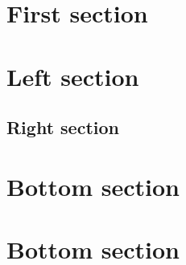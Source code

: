 \documentclass[a4paper, 12pt]{article}
\begin{document}
\begin{adjmulticols}{2}{0pt}{0pt}
\section{First section}
\lipsum[2]

\section{Left section}
\lipsum[1]
\end{adjmulticols}

\begin{adjmulticols}{1}{0pt}{0pt}
\section{Right section}
\lipsum[4]
\end{adjmulticols}

\begin{adjmulticols}{2}{0pt}{0pt}

\section{Bottom section}
\lipsum[2]

\section{Bottom section}
\lipsum[2]

\end{adjmulticols}
\end{document}
